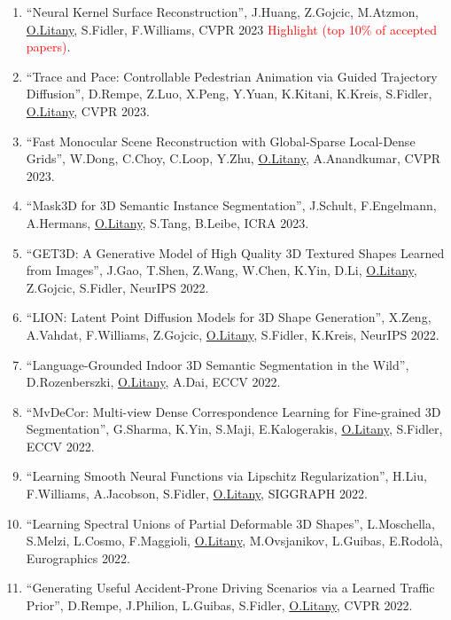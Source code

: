 \begin{enumerate}
\item ``Neural Kernel Surface Reconstruction'', J.Huang, Z.Gojcic, M.Atzmon, \underline{O.Litany}, S.Fidler, F.Williams, CVPR 2023 \textcolor{red}{Highlight (top 10\% of accepted papers)}.

\item ``Trace and Pace: Controllable Pedestrian Animation via Guided Trajectory Diffusion'', D.Rempe, Z.Luo, X.Peng, Y.Yuan, K.Kitani, K.Kreis, S.Fidler, \underline{O.Litany}, CVPR 2023.

\item ``Fast Monocular Scene Reconstruction with Global-Sparse Local-Dense Grids'', W.Dong, C.Choy, C.Loop, Y.Zhu, \underline{O.Litany}, A.Anandkumar, CVPR 2023.

\item ``Mask3D for 3D Semantic Instance Segmentation'', J.Schult, F.Engelmann, A.Hermans, \underline{O.Litany}, S.Tang, B.Leibe, ICRA 2023.

\item ``{GET3D}: A Generative Model of High Quality {3D} Textured Shapes Learned from Images'', J.Gao, T.Shen, Z.Wang, W.Chen, K.Yin, D.Li, \underline{O.Litany}, Z.Gojcic, S.Fidler, NeurIPS 2022.

\item ``LION: Latent Point Diffusion Models for 3D Shape Generation'', X.Zeng, A.Vahdat, F.Williams, Z.Gojcic, \underline{O.Litany}, S.Fidler, K.Kreis, NeurIPS 2022.

\item ``Language-Grounded Indoor 3D Semantic Segmentation in the Wild'', D.Rozenberszki, \underline{O.Litany}, A.Dai, ECCV 2022.

\item ``MvDeCor: Multi-view Dense Correspondence Learning for Fine-grained 3D Segmentation'', G.Sharma, K.Yin, S.Maji, E.Kalogerakis, \underline{O.Litany}, S.Fidler, ECCV 2022.

\item ``Learning Smooth Neural Functions via {Lipschitz} Regularization'', H.Liu, F.Williams, A.Jacobson, S.Fidler, \underline{O.Litany}, SIGGRAPH 2022.

\item ``Learning Spectral Unions of Partial Deformable 3D Shapes'', L.Moschella, S.Melzi, L.Cosmo, F.Maggioli, \underline{O.Litany}, M.Ovsjanikov, L.Guibas, E.Rodol{\`a}, Eurographics 2022.

\item ``Generating Useful Accident-Prone Driving Scenarios via a Learned Traffic Prior'', D.Rempe, J.Philion, L.Guibas, S.Fidler, \underline{O.Litany}, CVPR 2022.


\end{enumerate}
